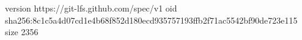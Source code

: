 version https://git-lfs.github.com/spec/v1
oid sha256:8c1c5a4d07cd1e4b68f852d180ecd935757193ffb2f71ac5542bf90de723e115
size 2356
